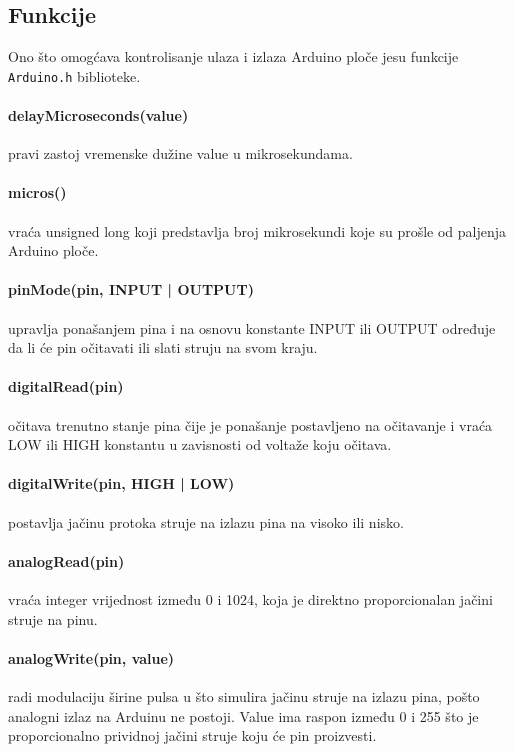 \documentclass[../Document.tex]{subfiles}
\begin{document}
\subsection{Funkcije}\label{funkcije}

Ono što omogćava kontrolisanje ulaza i izlaza Arduino ploče jesu funkcije \verb|Arduino.h| biblioteke.

\paragraph{delayMicroseconds(value)} pravi zastoj vremenske dužine value u mikrosekundama.

\paragraph{micros()} vraća unsigned long koji predstavlja broj mikrosekundi koje su prošle od paljenja Arduino ploče.

\paragraph{pinMode(pin, INPUT | OUTPUT)} upravlja ponašanjem pina i na osnovu konstante INPUT ili OUTPUT određuje da li će pin očitavati ili slati struju na svom kraju.

\paragraph{digitalRead(pin)} očitava trenutno stanje pina čije je ponašanje postavljeno na očitavanje i vraća LOW ili HIGH konstantu u zavisnosti od voltaže koju očitava.

\paragraph{digitalWrite(pin, HIGH | LOW)} postavlja jačinu protoka struje na izlazu pina na visoko ili nisko.

\paragraph{analogRead(pin)} vraća integer vrijednost između 0 i 1024, koja je direktno proporcionalan jačini struje na pinu.

\paragraph{analogWrite(pin, value)} radi modulaciju širine pulsa u što simulira jačinu struje na izlazu pina, pošto analogni izlaz na Arduinu ne postoji. Value ima raspon između 0 i 255 što je proporcionalno prividnoj jačini struje koju će pin proizvesti.
\end{document}
